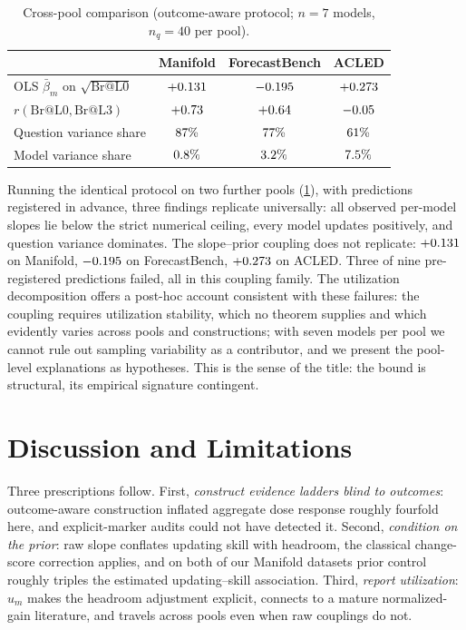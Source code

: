 \documentclass[conference]{IEEEtran}
\theoremstyle{plain}
\theoremstyle{remark}
\begin{document}
\begin{table}[t]
  \centering
  \footnotesize
  \setlength{\tabcolsep}{4pt}
  \caption{Cross-pool comparison (outcome-aware protocol; $n{=}7$ models, $n_q{=}40$ per pool).}
  \label{tab:cross-pool}
  \begin{tabular}{lccc}
    \toprule
    & Manifold & ForecastBench & ACLED \\
    \midrule
    OLS $\bar\beta_m$ on $\sqrt{\mathrm{Br@L0}}$ & $+0.131$ & $-0.195$ & $+0.273$ \\
    $r(\mathrm{Br@L0}, \mathrm{Br@L3})$          & $+0.73$ & $+0.64$ & $-0.05$ \\
    Question variance share                      & $87\%$ & $77\%$ & $61\%$ \\
    Model variance share                         & $0.8\%$ & $3.2\%$ & $7.5\%$ \\
    \bottomrule
  \end{tabular}
\end{table}

Running the identical protocol on two further pools (\cref{tab:cross-pool}), with predictions registered in advance, three findings replicate universally: all observed per-model slopes lie below the strict numerical ceiling, every model updates positively, and question variance dominates. The slope--prior coupling does not replicate: $+0.131$ on Manifold, $-0.195$ on ForecastBench, $+0.273$ on ACLED. Three of nine pre-registered predictions failed, all in this coupling family. The utilization decomposition offers a post-hoc account consistent with these failures: the coupling requires utilization stability, which no theorem supplies and which evidently varies across pools and constructions; with seven models per pool we cannot rule out sampling variability as a contributor, and we present the pool-level explanations as hypotheses. This is the sense of the title: the bound is structural, its empirical signature contingent.

\section{Discussion and Limitations}

Three prescriptions follow. First, \emph{construct evidence ladders blind to outcomes}: outcome-aware construction inflated aggregate dose response roughly fourfold here, and explicit-marker audits could not have detected it. Second, \emph{condition on the prior}: raw slope conflates updating skill with headroom, the classical change-score correction applies, and on both of our Manifold datasets prior control roughly triples the estimated updating--skill association. Third, \emph{report utilization}: $u_m$ makes the headroom adjustment explicit, connects to a mature normalized-gain literature, and travels across pools even when raw couplings do not.
\end{document}
